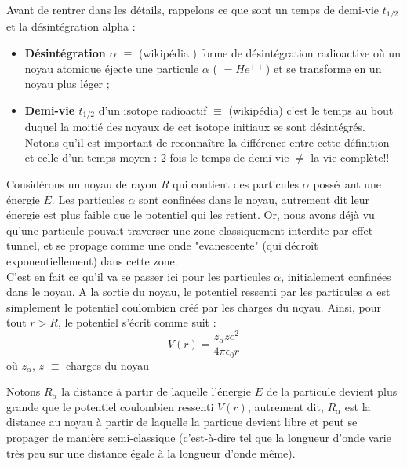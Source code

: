 \documentclass[12pt, a4paper]{book}
\begin{document}
Avant de rentrer dans les détails, rappelons ce que sont un temps de demi-vie $t_{1/2}$ et la désintégration alpha : 
\begin{itemize}[label = \textbullet]
  \item \textbf{Désintégration $\alpha$} $\equiv$ (wikipédia {\color{red}{à vérifier}}) forme de désintégration radioactive où un noyau atomique éjecte une particule $\alpha$
  ( $= He^{++}$) et se transforme en un noyau plus léger ; 
  \item \textbf{Demi-vie $t_{1/2}$} d'un isotope radioactif $\equiv$ (wikipédia) c'est le temps au bout duquel la moitié des noyaux de cet isotope initiaux se sont désintégrés. \\
  Notons qu'il est important de reconnaître la différence entre cette définition et celle d'un temps moyen : 2 fois le temps de demi-vie $\ne$ la vie complète!!  
\end{itemize}

Considérons un noyau de rayon $R$ qui contient des particules $\alpha$ possédant une énergie $E$. 
Les particules $\alpha$ sont confinées dans le noyau, autrement dit leur énergie est plus faible que le potentiel qui les retient.
Or, nous avons déjà vu qu'une particule pouvait traverser une zone classiquement interdite par effet tunnel, et se propage comme une onde "evanescente" (qui décroît exponentiellement) dans cette zone. \\
C'est en fait ce qu'il va se passer ici pour les particules $\alpha$, initialement confinées dans le noyau. 
A la sortie du noyau, le potentiel ressenti par les particules $\alpha$ est simplement le potentiel coulombien créé par les charges du noyau. Ainsi, pour tout $r > R$, le potentiel s'écrit comme suit :
\begin{equation}
  V(r) = \frac{z_{\alpha} z e^2}{4 \pi \epsilon_0 r} %
\end{equation}
où $z_{\alpha}$, $z$ $\equiv$ charges du noyau

Notons $R_{\alpha}$ la distance à partir de laquelle l'énergie $E$ de la particule devient plus grande que le potentiel coulombien ressenti $V(r)$, autrement dit, $R_{\alpha}$ est la distance au noyau à partir de laquelle la particue devient libre et peut se propager de manière semi-classique (c'est-à-dire tel que la longueur d'onde varie très peu sur une distance égale à la longueur d'onde même).
\end{document}
